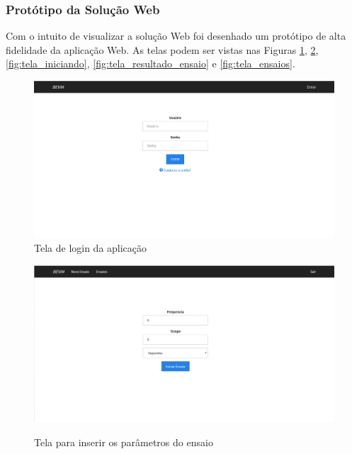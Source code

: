 \subsubsection*{\textbf{Protótipo da Solução Web}}

Com o intuito de visualizar a solução Web foi desenhado um protótipo de alta fidelidade da aplicação Web. As telas podem ser vistas nas Figuras \ref{fig:tela_login}, \ref{fig:tela_iniciar}, \ref{fig:tela_iniciando}, \ref{fig:tela_resultado_ensaio} e \ref{fig:tela_ensaios}.


\begin{figure}[H]
\centering
\label{fig:tela_login}
\includegraphics[keepaspectratio=true,scale=0.55]	{figuras/tela_login.png}
\caption{Tela de login da aplicação}
\end{figure}

\begin{figure}[H]
\centering
\includegraphics[keepaspectratio=true,scale=0.55]	{figuras/tela_iniciar.png}
\label{fig:tela_iniciar}
\caption{Tela para inserir os parâmetros do ensaio}
\end{figure}

